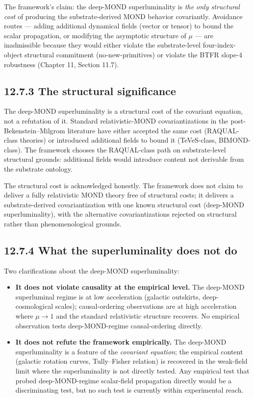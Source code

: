 \documentclass[11pt]{book}
\begin{document}
The framework's claim: the deep-MOND superluminality is \textit{the only structural cost} of producing the substrate-derived MOND behavior covariantly. Avoidance routes — adding additional dynamical fields (vector or tensor) to bound the scalar propagation, or modifying the asymptotic structure of $\mu$ — are inadmissible because they would either violate the substrate-level four-index-object structural commitment (no-new-primitives) or violate the BTFR slope-4 robustness (Chapter 11, Section 11.7).

\subsection{12.7.3 The structural significance}

The deep-MOND superluminality is a structural cost of the covariant equation, not a refutation of it. Standard relativistic-MOND covariantizations in the post-Bekenstein–Milgrom literature have either accepted the same cost (RAQUAL-class theories) or introduced additional fields to bound it (TeVeS-class, BIMOND-class). The framework chooses the RAQUAL-class path on substrate-level structural grounds: additional fields would introduce content not derivable from the substrate ontology.

The structural cost is acknowledged honestly. The framework does not claim to deliver a fully relativistic MOND theory free of structural costs; it delivers a substrate-derived covariantization with one known structural cost (deep-MOND superluminality), with the alternative covariantizations rejected on structural rather than phenomenological grounds.

\subsection{12.7.4 What the superluminality does not do}

Two clarifications about the deep-MOND superluminality:

\begin{itemize}
\item \textbf{It does not violate causality at the empirical level.} The deep-MOND superluminal regime is at low acceleration (galactic outskirts, deep-cosmological scales); causal-ordering observations are at high acceleration where $\mu \to 1$ and the standard relativistic structure recovers. No empirical observation tests deep-MOND-regime causal-ordering directly.
\item \textbf{It does not refute the framework empirically.} The deep-MOND superluminality is a feature of the \textit{covariant equation}; the empirical content (galactic rotation curves, Tully–Fisher relation) is recovered in the weak-field limit where the superluminality is not directly tested. Any empirical test that probed deep-MOND-regime scalar-field propagation directly would be a discriminating test, but no such test is currently within experimental reach.
\end{itemize}
\end{document}

